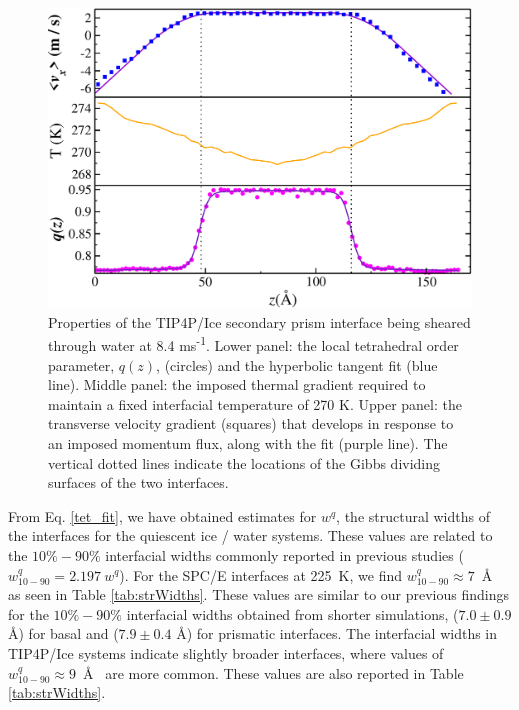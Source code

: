 \begin{figure}[H]
\includegraphics[width=\linewidth]{Figures/SecPrism_TIP4PIce_Plot}
\caption{\label{fig:tipsComic} Properties of the TIP4P/Ice secondary prism
  interface being sheared through water at 8.4
  ms\textsuperscript{-1}. Lower panel: the local tetrahedral order
  parameter, $q(z)$, (circles) and the hyperbolic tangent fit
  (blue line).  Middle panel: the imposed thermal gradient
  required to maintain a fixed interfacial temperature of 270 K. Upper
  panel: the transverse velocity gradient (squares) that develops in
  response to an imposed momentum flux, along with the fit (purple
  line). The vertical dotted lines indicate the locations of the Gibbs
  dividing surfaces of the two interfaces.}
\end{figure}

From Eq. \eqref{tet_fit}, we have obtained estimates for $w^{q}$, the
structural widths of the interfaces for the quiescent ice / water
systems. These values are related to the $10\%-90\%$ interfacial
widths commonly reported in previous studies
($w_\mathrm{10-90}^{q} = 2.197~w^{q}$).\cite{Bryk2002,Bryk2004} For the
SPC/E interfaces at 225~K, we find
$w_\mathrm{10-90}^{q} \approx 7$~\AA~ as seen in Table
\ref{tab:strWidths}. These values are similar to our previous findings
for the $10\%-90\%$ interfacial widths obtained from shorter
simulations, ($7.0 \pm 0.9$ \AA) for basal and ($7.9 \pm 0.4$ \AA) for
prismatic interfaces.\cite{Louden2013a} The interfacial widths in
TIP4P/Ice systems indicate slightly broader interfaces, where values
of $w_\mathrm{10-90}^{q} \approx 9$~\AA~ are more common. These values
are also reported in Table \ref{tab:strWidths}.

